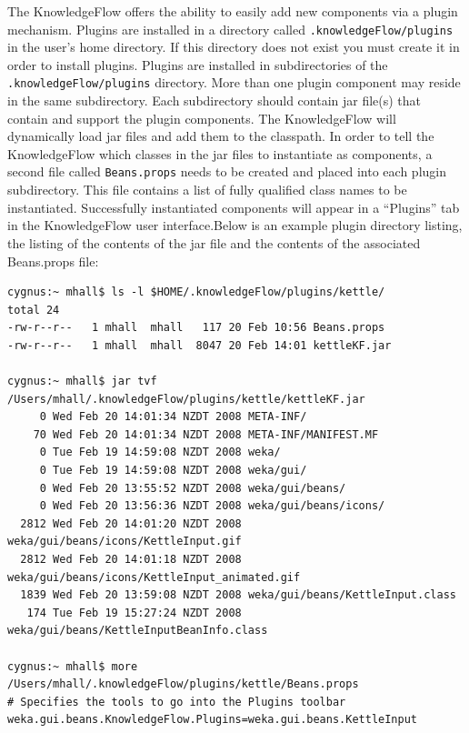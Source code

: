 The KnowledgeFlow offers the ability to easily add new components via
a plugin mechanism. Plugins are installed in a directory called
\verb=.knowledgeFlow/plugins= in the user's home directory. If this
directory does not exist you must create it in order to install
plugins. Plugins are installed in subdirectories of the
\verb=.knowledgeFlow/plugins= directory. More than one plugin
component may reside in the same subdirectory. Each subdirectory
should contain jar file(s) that contain and support the plugin
components. The KnowledgeFlow will dynamically load jar files and add
them to the classpath. In order to tell the KnowledgeFlow which
classes in the jar files to instantiate as components, a second file
called \verb=Beans.props= needs to be created and placed into each
plugin subdirectory. This file contains a list of fully qualified
class names to be instantiated. Successfully instantiated components
will appear in a ``Plugins'' tab in the KnowledgeFlow user
interface.Below is an example plugin directory listing, the listing of
the contents of the jar file and the contents of the associated
Beans.props file:

\begin{verbatim}
cygnus:~ mhall$ ls -l $HOME/.knowledgeFlow/plugins/kettle/
total 24
-rw-r--r--   1 mhall  mhall   117 20 Feb 10:56 Beans.props
-rw-r--r--   1 mhall  mhall  8047 20 Feb 14:01 kettleKF.jar

cygnus:~ mhall$ jar tvf /Users/mhall/.knowledgeFlow/plugins/kettle/kettleKF.jar 
     0 Wed Feb 20 14:01:34 NZDT 2008 META-INF/
    70 Wed Feb 20 14:01:34 NZDT 2008 META-INF/MANIFEST.MF
     0 Tue Feb 19 14:59:08 NZDT 2008 weka/
     0 Tue Feb 19 14:59:08 NZDT 2008 weka/gui/
     0 Wed Feb 20 13:55:52 NZDT 2008 weka/gui/beans/
     0 Wed Feb 20 13:56:36 NZDT 2008 weka/gui/beans/icons/
  2812 Wed Feb 20 14:01:20 NZDT 2008 weka/gui/beans/icons/KettleInput.gif
  2812 Wed Feb 20 14:01:18 NZDT 2008 weka/gui/beans/icons/KettleInput_animated.gif
  1839 Wed Feb 20 13:59:08 NZDT 2008 weka/gui/beans/KettleInput.class
   174 Tue Feb 19 15:27:24 NZDT 2008 weka/gui/beans/KettleInputBeanInfo.class

cygnus:~ mhall$ more /Users/mhall/.knowledgeFlow/plugins/kettle/Beans.props 
# Specifies the tools to go into the Plugins toolbar
weka.gui.beans.KnowledgeFlow.Plugins=weka.gui.beans.KettleInput
\end{verbatim}
